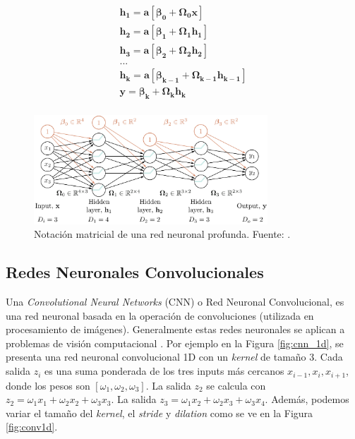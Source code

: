 \begin{equation}\label{equa:dl_1}
	\begin{gathered}
		\mathbf{h_1 = a [ \beta_{0} + \Omega_{0}x  ]}	 \\
		\mathbf{h_2 = a [ \beta_{1} + \Omega_{1} h_1  ]}	 \\
		\mathbf{h_3 = a [ \beta_{2} + \Omega_{2} h_2  ]}	 \\
		... \\
		\mathbf{h_k = a [ \beta_{k-1} + \Omega_{k-1} h_{k-1}  ]}	 \\
		\mathbf{y = \beta_{k} + \Omega_{k} h_{k} }	 \\
	\end{gathered}
\end{equation}

\begin{figure}[]
	\centering
	\includegraphics[width=0.78\textwidth]{../img/theory/deep_nn}
	\caption{Notación matricial de una red neuronal profunda. Fuente: \cite{prince2023understanding}.}
	\label{fig:deep_nn}
\end{figure}


\subsection{Redes Neuronales Convolucionales}

Una \textit{Convolutional Neural Networks} (CNN) o Red Neuronal Convolucional, es una red neuronal basada en la operación de convoluciones (utilizada en procesamiento de imágenes). Generalmente estas redes neuronales se aplican a problemas de visión computacional \citep{zhang2021dive}. Por ejemplo en la Figura \ref{fig:cnn_1d}, se presenta una red neuronal convolucional 1D con un \textit{kernel} de tamaño 3.  Cada salida $z_i$ es una suma ponderada de los tres inputs más cercanos $x_{i-1}, x_{i}, x_{i+1}$, donde los pesos son $[\omega_1, \omega_2, \omega_3]$. La salida $z_2$ se calcula con $z_2 = \omega_1x_1 + \omega_2x_2 + \omega_3x_3$. La salida $z_3 = \omega_1x_2 + \omega_2x_3 + \omega_3x_4$. Además, podemos variar el tamaño del \textit{kernel},  el \textit{stride} y \textit{dilation} como se ve en la Figura \ref{fig:conv1d}.

